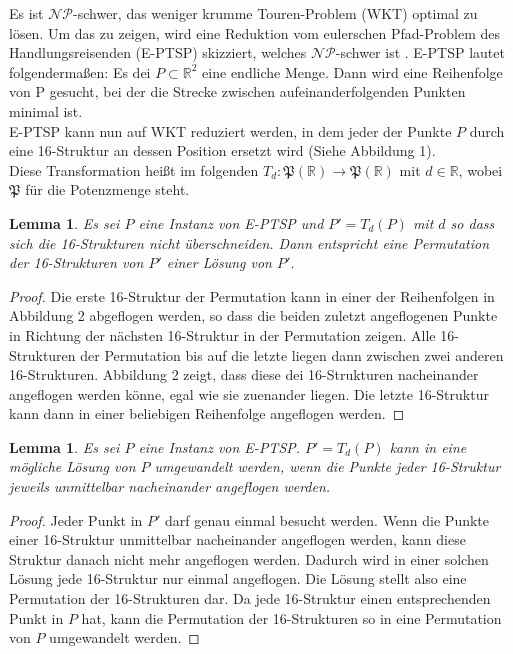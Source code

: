 \documentclass[a4paper,10pt,ngerman]{scrartcl}
\newtheorem{lemma}[theorem]{Lemma}
\begin{document}
Es ist $\mathcal{NP}$-schwer, das weniger krumme Touren-Problem (WKT) optimal
zu lösen. Um das zu zeigen, wird eine Reduktion vom eulerschen Pfad-Problem des
Handlungsreisenden (E-PTSP) skizziert, welches $\mathcal{NP}$-schwer ist \cite{papadimitriou_1977}. E-PTSP lautet folgendermaßen: Es dei $P \subset
  \mathbb{R}^2$ eine endliche Menge. Dann wird eine Reihenfolge von P gesucht,
bei der die Strecke zwischen aufeinanderfolgenden Punkten minimal ist. \\
E-PTSP kann nun auf WKT reduziert werden, in dem jeder der Punkte $P$ durch
eine 16-Struktur an dessen Position ersetzt wird (Siehe Abbildung 1).\\
Diese Transformation heißt im folgenden $T_d: \mathfrak{P}(\mathbb{R}) \rightarrow \mathfrak{P}(\mathbb{R})$
  mit $d \in \mathbb{R}$,
wobei $\mathfrak{P}$ für die Potenzmenge steht.
\begin{lemma}
  Es sei $P$ eine Instanz von E-PTSP und $P'=T_d(P)$ mit $d$ so dass sich die 16-Strukturen nicht überschneiden.
  Dann entspricht eine Permutation der 16-Strukturen von $P'$ einer Lösung von $P'$.
\end{lemma}
\begin{proof}
  Die erste 16-Struktur der Permutation kann in einer der Reihenfolgen in Abbildung 2 abgeflogen werden, so dass
  die beiden zuletzt angeflogenen Punkte in Richtung der nächsten 16-Struktur in der Permutation zeigen.
  Alle 16-Strukturen der Permutation bis auf die letzte liegen dann zwischen zwei anderen 16-Strukturen.
  Abbildung 2 zeigt, dass diese dei 16-Strukturen nacheinander angeflogen werden könne, egal wie sie zuenander
  liegen. Die letzte 16-Struktur kann dann in einer beliebigen Reihenfolge angeflogen werden.
\end{proof}
\begin{lemma}
  Es sei $P$ eine Instanz von E-PTSP. 
  $P' = T_d(P)$ kann in eine mögliche Lösung von $P$ umgewandelt werden,
  wenn die Punkte jeder 16-Struktur jeweils unmittelbar nacheinander angeflogen werden.
\end{lemma}
\begin{proof}
  Jeder Punkt in $P'$ darf genau einmal besucht werden. Wenn die Punkte einer 16-Struktur
  unmittelbar nacheinander angeflogen werden, kann diese Struktur danach nicht mehr angeflogen werden.
  Dadurch wird in einer solchen Lösung jede 16-Struktur nur einmal angeflogen. Die Lösung stellt also
  eine Permutation der 16-Strukturen dar. Da jede 16-Struktur einen entsprechenden Punkt in $P$ hat,
  kann die Permutation der 16-Strukturen so in eine Permutation von $P$ umgewandelt werden.
\end{proof}
\end{document}
